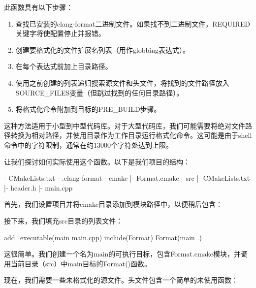 此函数具有以下步骤：

\begin{enumerate}
\item
查找已安装的clang-format二进制文件。如果找不到二进制文件，REQUIRED关键字将使配置停止并报错。

\item
创建要格式化的文件扩展名列表（用作globbing表达式）。

\item
在每个表达式前加上目录路径。

\item
使用之前创建的列表递归搜索源文件和头文件，将找到的文件路径放入SOURCE\_FILES变量（但跳过找到的任何目录路径）。

\item
将格式化命令附加到目标的PRE\_BUILD步骤。
\end{enumerate}

这种方法适用于小型到中型代码库。对于大型代码库，我们可能需要将绝对文件路径转换为相对路径，并使用目录作为工作目录运行格式化命令。这可能是由于shell命令中的字符限制，通常在约13000个字符处达到上限。

让我们探讨如何实际使用这个函数。以下是我们项目的结构：

\begin{shell}
- CMakeLists.txt
- .clang-format
- cmake
  |- Format.cmake
- src
  |- CMakeLists.txt
  |- header.h
  |- main.cpp
\end{shell}

首先，我们设置项目并将cmake目录添加到模块路径中，以便稍后包含：



接下来，我们填充src目录的列表文件：


\begin{cmake}
add_executable(main main.cpp)
include(Format)
Format(main .)
\end{cmake}

这很简单。我们创建一个名为main的可执行目标，包含Format.cmake模块，并调用当前目录（src）中main目标的Format()函数。

现在，我们需要一些未格式化的源文件。头文件包含一个简单的未使用函数：

